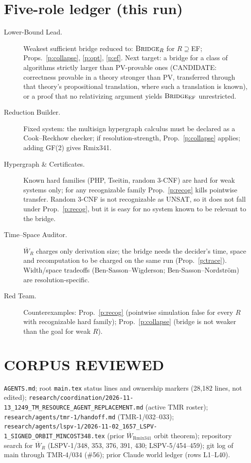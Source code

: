 \documentclass[11pt]{article}
\theoremstyle{definition}\newtheorem{definition}[theorem]{Definition}
\theoremstyle{remark}\newtheorem{remark}[theorem]{Remark}
\begin{document}
\section{Five-role ledger (this run)}
\begin{description}
\item[Lower-Bound Lead.] Weakest sufficient bridge reduced to: $\textsc{Bridge}_R$ for $R\supseteq$EF; Props.~\ref{p:collapse},
\ref{p:opt}, \ref{p:ef}. Next target: a bridge for a class of algorithms strictly larger than PV-provable ones (CANDIDATE: correctness provable in a theory stronger than PV,
transferred through that theory's propositional translation, where such a translation is known), or a proof that no relativizing argument yields
$\textsc{Bridge}_{\mathrm{EF}}$ unrestricted.
\item[Reduction Builder.] Fixed system: the multisign hypergraph calculus must be declared as a Cook--Reckhow checker; if
resolution-strength, Prop.~\ref{p:collapse} applies; adding GF(2) gives Rmix341.
\item[Hypergraph \& Certificates.] Known hard families (PHP, Tseitin, random 3-CNF) are hard for weak systems only; for any
recognizable family Prop.~\ref{p:recog} kills pointwise transfer. Random 3-CNF is not recognizable as UNSAT, so it does not fall under
Prop.~\ref{p:recog}, but it is easy for no system known to be relevant to the bridge.
\item[Time--Space Auditor.] $\overline W_R$ charges only derivation size; the bridge needs the decider's time, space and recomputation to
be charged on the same run (Prop.~\ref{p:trace}). Width/space tradeoffs (Ben-Sasson--Wigderson; Ben-Sasson--Nordstr\"om) are
resolution-specific.
\item[Red Team.] Counterexamples: Prop.~\ref{p:recog} (pointwise simulation false for every $R$ with recognizable hard family);
Prop.~\ref{p:collapse} (bridge is not weaker than the goal for weak $R$).
\end{description}

\section*{CORPUS REVIEWED}
\texttt{AGENTS.md}; root \texttt{main.tex} status lines and ownership markers (28{,}182 lines, not edited);
\texttt{research/coordination/2026-11-13\_1249\_TM\_RESOURCE\_AGENT\_REPLACEMENT.md} (active TMR roster);
\texttt{research/agents/tmr-1/handoff.md} (TMR-1/032--033); \texttt{research/agents/lspv-1/2026-11-02\_1657\_LSPV-1\_SIGNED\_ORBIT\_MINCOST348.tex}
(prior $\overline W_{\mathrm{Rmix341}}$ orbit theorem); repository search for $\overline W_R$ (LSPV-1/348, 353, 376, 391, 430; LSPV-5/454--459);
git log of main through TMR-4/034 (\#56); prior Claude world ledger (rows L1--L40).
\end{document}
